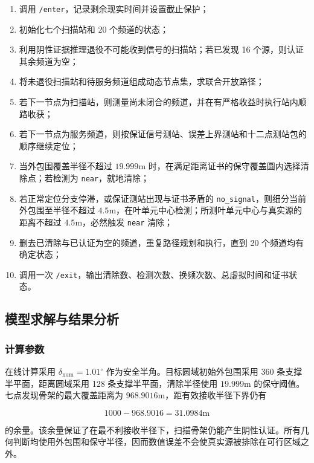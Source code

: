 \begin{enumerate}
\item 调用 \texttt{/enter}，记录剩余现实时间并设置截止保护；
\item 初始化七个扫描站和 20 个频道的状态；
\item 利用阴性证据推理退役不可能收到信号的扫描站；若已发现 16 个源，则认证其余频道为空；
\item 将未退役扫描站和待服务频道组成动态节点集，求联合开放路径；
\item 若下一节点为扫描站，则测量尚未闭合的频道，并在有严格收益时执行站内顺路收获；
\item 若下一节点为服务频道，则按保证信号测站、误差上界测站和十二点测站包的顺序继续定位；
\item 当外包围覆盖半径不超过 $19.999\mathrm{m}$ 时，在满足距离证书的保守覆盖圆内选择清除点；若检测为 \texttt{near}，就地清除；
\item 若正常定位分支停滞，或保证测站出现与证书矛盾的 \texttt{no\_signal}，则细分当前外包围至半径不超过 $4.5\mathrm{m}$，在叶单元中心检测；所测叶单元中心与真实源的距离不超过 $4.5\mathrm{m}$，必然触发 \texttt{near} 清除；
\item 删去已清除与已认证为空的频道，重复路径规划和执行，直到 20 个频道均有确定状态；
\item 调用一次 \texttt{/exit}，输出清除数、检测次数、换频次数、总虚拟时间和证书状态。
\end{enumerate}

\subsection{模型求解与结果分析}

\subsubsection{计算参数}

在线计算采用 $\delta_{\mathrm{num}}=1.01^\circ$ 作为安全半角。目标圆域初始外包围采用 360 条支撑半平面，距离圆域采用 128 条支撑半平面，清除半径使用 $19.999\mathrm{m}$ 的保守阈值。七点发现骨架的最大覆盖距离为 $968.9016\mathrm{m}$，距有效接收半径下界仍有

\begin{equation}
1000-968.9016=31.0984\mathrm{m}
\label{eq:q3_cover_margin}
\end{equation}

的余量。该余量保证了在最不利接收半径下，扫描骨架仍能产生阴性认证。所有几何判断均使用外包围和保守半径，因而数值误差不会使真实源被排除在可行区域之外。

